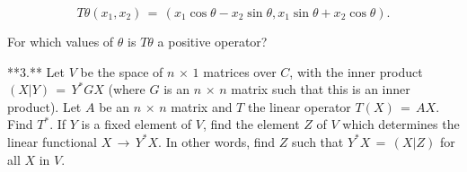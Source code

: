 \[T\theta(x_{1},x_{2})\,=\,(x_{1}\cos\theta-x_{2}\sin\theta,x_{1}\sin\theta+x_ {2}\cos\theta).\]

For which values of \(\theta\) is \(T\theta\) a positive operator?

**3.** Let \(V\) be the space of \(n\,\times\,1\) matrices over \(C\), with the inner product \((X|Y)\,=\,Y^{*}GX\) (where \(G\) is an \(n\,\times\,n\) matrix such that this is an inner product). Let \(A\) be an \(n\,\times\,n\) matrix and \(T\) the linear operator \(T(X)\,=\,AX\). Find \(T^{*}\). If \(Y\) is a fixed element of \(V\), find the element \(Z\) of \(V\) which determines the linear functional \(X\,\xrightarrow{}\,Y^{*}X\). In other words, find \(Z\) such that \(Y^{*}X\,=\,(X|Z)\) for all \(X\) in \(V\).

 